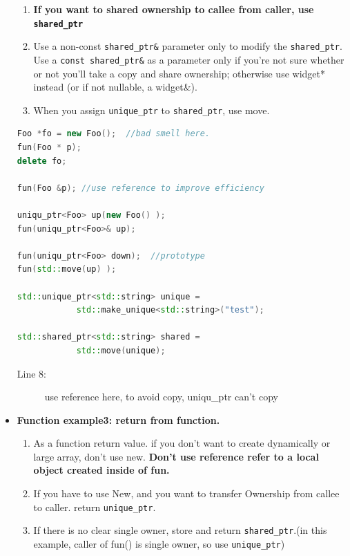 \documentclass[a4paper,11pt,twoside]{book}
\begin{document}
\begin{itemize}
\begin{enumerate}
\item \textbf{If you want to shared ownership to callee from caller, use \texttt{shared\_ptr}}

\item Use a non-const \texttt{shared\_ptr\&} parameter only to modify the \texttt{shared\_ptr}. Use a \texttt{const shared\_ptr\&} as a parameter only if you're not sure whether or not you'll take a copy and share ownership; otherwise use widget* instead (or if not nullable, a widget\&).

\item When you assign \texttt{unique\_ptr} to \texttt{shared\_ptr}, use move.
\end{enumerate}

\begin{lstlisting}[frame=single, language=c++]
Foo *fo = new Foo();  //bad smell here.
fun(Foo * p);
delete fo;

fun(Foo &p); //use reference to improve efficiency

uniqu_ptr<Foo> up(new Foo() );
fun(uniqu_ptr<Foo>& up);

fun(uniqu_ptr<Foo> down);  //prototype
fun(std::move(up) );

std::unique_ptr<std::string> unique = 
			std::make_unique<std::string>("test");
			
std::shared_ptr<std::string> shared = 
			std::move(unique);
\end{lstlisting}
\begin{description}
	\item[Line 8:] use reference here, to avoid copy, uniqu\_ptr can't copy
\end{description}

\item \textbf{Function example3: return from function.}
\begin{enumerate}
\item As a function return value. if you don't want to create dynamically or large array, don't use new. \textbf{Don't  use reference refer to a local object created inside of fun.}

\item If you have to use New, and you want to transfer Ownership from callee to caller. return \texttt{unique\_ptr}.

\item If there is no clear single owner, store and return \texttt{shared\_ptr}.(in this example, caller of fun() is single owner, so use \texttt{unique\_ptr})


\end{enumerate}
\end{itemize}
\end{document}
